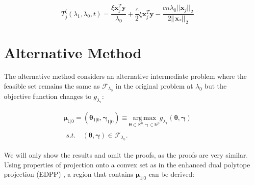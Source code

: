 \begin{equation}
    T^\xi_j(\lambda_1,\lambda_0,t)=\frac{\xi \boldsymbol x_j^T \boldsymbol y}{\lambda_0}+\frac{c}{2}\xi\boldsymbol x_j^T\boldsymbol y-\frac{cn\lambda_0||\boldsymbol x_j||_2}{2||\boldsymbol x_*||_2}
\end{equation}

\fi

\section{Alternative Method}

The alternative method considers an alternative intermediate problem where the feasible set remains the same as $\mathcal{F}_{\lambda_0}$ in the original problem at $\lambda_0$ but the objective function changes to $g_{\lambda_1}$:

\begin{gather}
        \label{eq:dualmialt}
        \boldsymbol\mu_{1|0}=(\boldsymbol\theta_{1|0},\boldsymbol\gamma_{1|0})\equiv\underset{\boldsymbol\theta\in \mathbb{R}^{ n},\boldsymbol\gamma\in\mathbb{R}^p}{\mathrm{arg\,max}}g_{\lambda_1}(\boldsymbol\theta,\boldsymbol\gamma)\\
        \begin{aligned}s.t.\quad (\boldsymbol\theta,\boldsymbol\gamma)\in \mathcal{F}_{\lambda_0}\nonumber.
        \end{aligned}
\end{gather}

We will only show the results and omit the proofs, as the proofs are very similar. Using properties of projection onto a convex set as in the enhanced dual polytope projection (EDPP) \citep{wang2013lasso}, a region that contains $\boldsymbol\mu_{1|0}$ can be derived:

